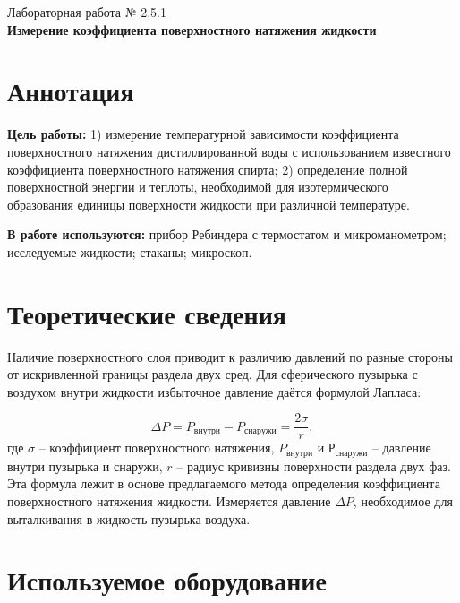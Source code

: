 \documentclass[a4paper,12pt]{article} %
\begin{document}
\begin{center}   
	\large{Лабораторная работа № 2.5.1\\\textbf{Измерение коэффициента поверхностного натяжения жидкости}}\\
\end{center}

\section{Аннотация}

\noindent\textbf{Цель работы:}
1) измерение температурной зависимости  коэффициента поверхностного натяжения дистиллированной воды с использованием известного коэффициента поверхностного натяжения спирта; 2) определение полной поверхностной энергии  и теплоты, необходимой для изотермического образования единицы  поверхности жидкости  при различной температуре.
	
\bigskip
\noindent\textbf{В работе используются:} прибор  Ребиндера  с термостатом и микроманометром; исследуемые жидкости; стаканы; микроскоп.

\section{Теоретические сведения}

Наличие поверхностного слоя приводит к различию давлений по разные стороны от искривленной границы раздела двух сред.  Для сферического пузырька с воздухом  внутри жидкости избыточное давление даётся формулой Лапласа:

\begin{equation}\label{лаплас}
\Delta P = P_{внутри}- P_{снаружи}=\frac{2\sigma}{r}, 
\end{equation}
где $\sigma$ -- коэффициент поверхностного натяжения, $P_{внутри}$ и $Р_{снаружи}$ -- давление внутри пузырька и снаружи, $r$ -- радиус кривизны поверхности раздела двух фаз. Эта формула лежит в основе предлагаемого метода определения коэффициента поверхностного натяжения жидкости. Измеряется давление $\Delta P$, необходимое для выталкивания в жидкость пузырька воздуха.

\newpage
\section{Используемое оборудование}
\end{document}
